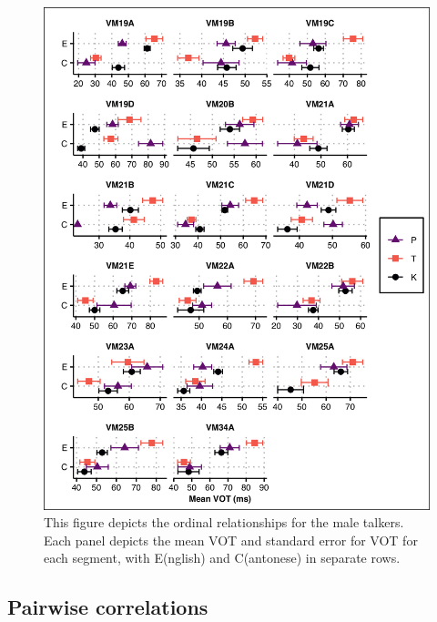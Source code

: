 \begin{figure}[htbp]
  \begin{center}
  \includegraphics[width=0.9\linewidth]{figures/ch4_ordrel_vm_5in.png} 
  \caption{This figure depicts the ordinal relationships for the male talkers. Each panel depicts the mean VOT and standard error for VOT for each segment, with E(nglish) and C(antonese) in separate rows.}
  \label{ch4:fig:ordrelvm}
  \end{center}
\end{figure}


\subsection{Pairwise correlations}\label{ch4:sec:correlations}

